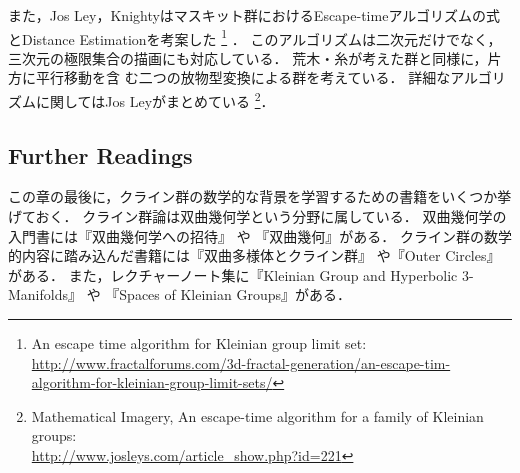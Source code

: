 また，Jos Ley，Knightyはマスキット群におけるEscape-timeアルゴリズムの式
とDistance Estimationを考案した
\footnote{An escape time algorithm for Kleinian group limit set:\\
\url{http://www.fractalforums.com/3d-fractal-generation/an-escape-tim-algorithm-for-kleinian-group-limit-sets/}}
．
このアルゴリズムは二次元だけでなく，三次元の極限集合の描画にも対応している．
荒木・糸\cite{araki2008extension}が考えた群と同様に，片方に平行移動を含
む二つの放物型変換による群を考えている．
詳細なアルゴリズムに関してはJos Leyがまとめている
\footnote{Mathematical Imagery, An escape-time algorithm for a family of
Kleinian groups:\\
\url{http://www.josleys.com/article_show.php?id=221}}．

\subsection{Further Readings}

この章の最後に，クライン群の数学的な背景を学習するための書籍をいくつか挙げておく．
クライン群論は双曲幾何学という分野に属している．
双曲幾何学の入門書には『双曲幾何学への招待』
\cite{taniguchi_okumura199610invitation}や
『双曲幾何』\cite{mitani200409hyperbolicGeometry}がある．
クライン群の数学的内容に踏み込んだ書籍には『双曲多様体とクライン群』
\cite{taniguchi_matsuzaki_hyperbolicManifold}や『Outer Circles』
\cite{Marden200705outerCircles}がある．
また，レクチャーノート集に『Kleinian Group and Hyperbolic 3-Manifolds』
\cite{Y._V._C.200311}や
『Spaces of Kleinian Groups』\cite{Yair_Makoto_Caroline200606}がある．

\clearpage
